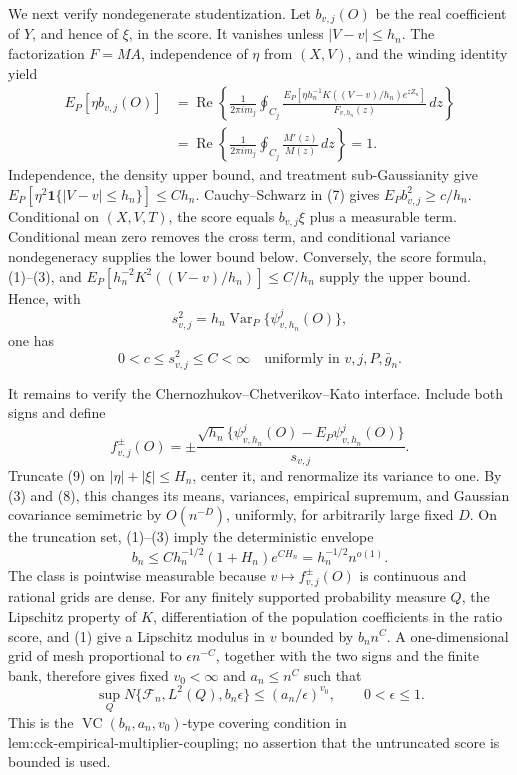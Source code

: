 We next verify nondegenerate studentization.  Let \(b_{v,j}(O)\) be the real coefficient of \(Y\), and hence of \(\xi\), in the score.  It vanishes unless \(|V-v|\le h_n\).  The factorization \(F=MA\), independence of \(\eta\) from \((X,V)\), and the winding identity yield
\[
 \begin{aligned}
 E_P[\eta b_{v,j}(O)]
 &=\operatorname{Re}\left\{\frac1{2\pi i m_j}\oint_{C_j}
 \frac{E_P[\eta h_n^{-1}K((V-v)/h_n)e^{zZ_n}]}{F_{v,h_n}(z)}\,dz\right\}\\
 &=\operatorname{Re}\left\{\frac1{2\pi i m_j}\oint_{C_j}\frac{M'(z)}{M(z)}\,dz\right\}=1. 
 \end{aligned} \tag{7}
\]
Independence, the density upper bound, and treatment sub-Gaussianity give
\(E_P[\eta^2\mathbf 1\{|V-v|\le h_n\}]\le Ch_n\).  Cauchy--Schwarz in (7) gives \(E_Pb_{v,j}^2\ge c/h_n\).  Conditional on \((X,V,T)\), the score equals \(b_{v,j}\xi\) plus a measurable term.  Conditional mean zero removes the cross term, and conditional variance nondegeneracy supplies the lower bound below.  Conversely, the score formula, (1)--(3), and
\(E_P[h_n^{-2}K^2((V-v)/h_n)]\le C/h_n\) supply the upper bound.  Hence, with
\[
 s_{v,j}^2=h_n\operatorname{Var}_P\{\psi^j_{v,h_n}(O)\},
\]
one has
\[
 0<c\le s_{v,j}^2\le C<\infty
 \quad\text{uniformly in }v,j,P,\bar g_n. \tag{8}
\]

It remains to verify the Chernozhukov--Chetverikov--Kato interface.  Include both signs and define
\[
 f_{v,j}^{\pm}(O)=\pm
 \frac{\sqrt{h_n}\{\psi^j_{v,h_n}(O)-E_P\psi^j_{v,h_n}(O)\}}{s_{v,j}}. \tag{9}
\]
Truncate (9) on \(|\eta|+|\xi|\le H_n\), center it, and renormalize its variance to one.  By (3) and (8), this changes its means, variances, empirical supremum, and Gaussian covariance semimetric by \(O(n^{-D})\), uniformly, for arbitrarily large fixed \(D\).  On the truncation set, (1)--(3) imply the deterministic envelope
\[
 b_n\le Ch_n^{-1/2}(1+H_n)e^{CH_n}
 =h_n^{-1/2}n^{o(1)}. \tag{10}
\]
The class is pointwise measurable because \(v\mapsto f_{v,j}^{\pm}(O)\) is continuous and rational grids are dense.  For any finitely supported probability measure \(Q\), the Lipschitz property of \(K\), differentiation of the population coefficients in the ratio score, and (1) give a Lipschitz modulus in \(v\) bounded by \(b_nn^C\).  A one-dimensional grid of mesh proportional to \(\epsilon n^{-C}\), together with the two signs and the finite bank, therefore gives fixed \(v_0<\infty\) and \(a_n\le n^C\) such that
\[
 \sup_QN\{\mathcal F_n,L^2(Q),b_n\epsilon\}
 \le(a_n/\epsilon)^{v_0},
 \qquad 0<\epsilon\le1. \tag{11}
\]
This is the \(\operatorname{VC}(b_n,a_n,v_0)\)-type covering condition in \(\text{lem:cck-empirical-multiplier-coupling}\); no assertion that the untruncated score is bounded is used.

